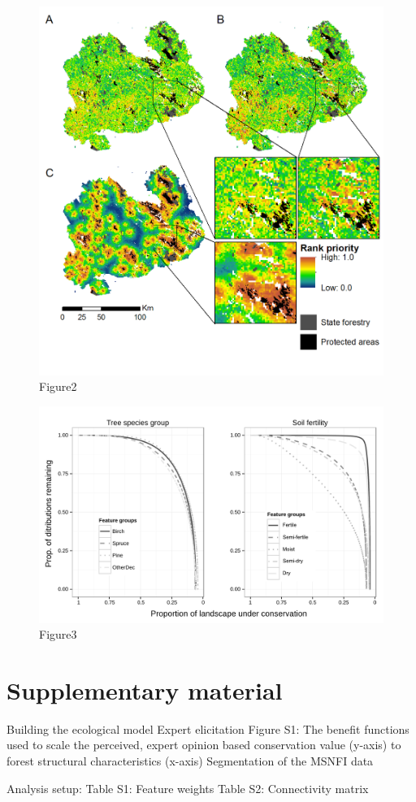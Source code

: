 \documentclass[]{article}
\begin{document}
\begin{figure}[htbp]
\centering
\includegraphics{figs/Fig2.png}
\caption{Figure2}
\end{figure}

\begin{figure}[htbp]
\centering
\includegraphics{figs/Fig3.png}
\caption{Figure3}
\end{figure}

\section{Supplementary material}

Building the ecological model Expert elicitation Figure S1: The benefit
functions used to scale the perceived, expert opinion based conservation
value (y-axis) to forest structural characteristics (x-axis)
Segmentation of the MSNFI data

Analysis setup: Table S1: Feature weights Table S2: Connectivity matrix
\end{document}
